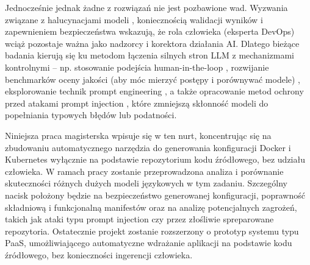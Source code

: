 Jednocześnie jednak żadne z rozwiązań nie jest pozbawione wad. Wyzwania związane z halucynacjami modeli \cite{low_repairing_2024}, koniecznością walidacji wyników \cite{ueno_migrating_2024, kon_iac-eval_nodate} i zapewnieniem bezpieczeństwa \cite{malul_genkubesec_2024, fu_security_2025} wskazują, że rola człowieka (eksperta DevOps) wciąż pozostaje ważna jako nadzorcy i korektora działania AI. Dlatego bieżące badania kierują się ku metodom łączenia silnych stron LLM z mechanizmami kontrolnymi – np. stosowanie podejścia human-in-the-loop \cite{low_repairing_2024}, rozwijanie benchmarków oceny jakości (aby móc mierzyć postępy i porównywać modele) \cite{ueno_migrating_2024, kon_iac-eval_nodate}, eksplorowanie technik prompt engineering \cite{kratzke_dont_2024, pujar_invited_2023}, a także opracowanie metod ochrony przed atakami prompt injection \cite{liu_prompt_2024}, które zmniejszą skłonność modeli do popełniania typowych błędów lub podatności.

Niniejsza praca magisterska wpisuje się w ten nurt, koncentrując się na zbudowaniu automatycznego narzędzia do generowania konfiguracji Docker i Kubernetes wyłącznie na podstawie repozytorium kodu źródłowego, bez udziału człowieka. W ramach pracy zostanie przeprowadzona analiza i porównanie skuteczności różnych dużych modeli językowych w tym zadaniu. Szczególny nacisk położony będzie na bezpieczeństwo generowanej konfiguracji, poprawność składniową i funkcjonalną manifestów oraz na analizę potencjalnych zagrożeń, takich jak ataki typu prompt injection czy przez złośliwie spreparowane repozytoria. Ostatecznie projekt zostanie rozszerzony o prototyp systemu typu PaaS, umożliwiającego automatyczne wdrażanie aplikacji na podstawie kodu źródłowego, bez konieczności ingerencji człowieka.